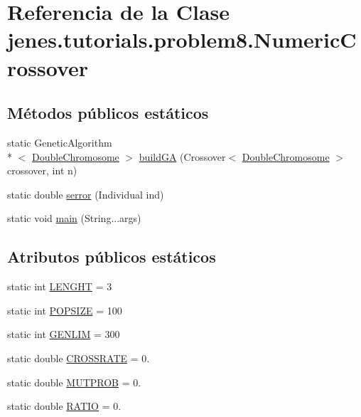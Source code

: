 \hypertarget{classjenes_1_1tutorials_1_1problem8_1_1_numeric_crossover}{\section{Referencia de la Clase jenes.\-tutorials.\-problem8.\-Numeric\-Crossover}
\label{classjenes_1_1tutorials_1_1problem8_1_1_numeric_crossover}
}
\subsection*{Métodos públicos estáticos}
\begin{DoxyCompactItemize}
\item 
static Genetic\-Algorithm\\*
$<$ \hyperlink{classjenes_1_1chromosome_1_1_double_chromosome}{Double\-Chromosome} $>$ \hyperlink{classjenes_1_1tutorials_1_1problem8_1_1_numeric_crossover_a8af3f285354dc96e81647a03d76d93c5}{build\-G\-A} (Crossover$<$ \hyperlink{classjenes_1_1chromosome_1_1_double_chromosome}{Double\-Chromosome} $>$ crossover, int n)
\item 
static double \hyperlink{classjenes_1_1tutorials_1_1problem8_1_1_numeric_crossover_aef1de8d283010a790fb20661fae423f2}{serror} (Individual ind)
\item 
static void \hyperlink{classjenes_1_1tutorials_1_1problem8_1_1_numeric_crossover_a11da9d09414921591a53cddb601cc203}{main} (String...\-args)
\end{DoxyCompactItemize}
\subsection*{Atributos públicos estáticos}
\begin{DoxyCompactItemize}
\item 
static int \hyperlink{classjenes_1_1tutorials_1_1problem8_1_1_numeric_crossover_af73d636c488b92bf3ae33d19d1f5f5e7}{L\-E\-N\-G\-H\-T} = 3
\item 
static int \hyperlink{classjenes_1_1tutorials_1_1problem8_1_1_numeric_crossover_a0a9b3b839ab6677dcbae723434df6551}{P\-O\-P\-S\-I\-Z\-E} = 100
\item 
static int \hyperlink{classjenes_1_1tutorials_1_1problem8_1_1_numeric_crossover_a5e45487dcf5730d7c628ca85b21160dc}{G\-E\-N\-L\-I\-M} = 300
\item 
static double \hyperlink{classjenes_1_1tutorials_1_1problem8_1_1_numeric_crossover_ae4fcf3a595e386c6aeec443dedaba83f}{C\-R\-O\-S\-S\-R\-A\-T\-E} = 0.
\item 
static double \hyperlink{classjenes_1_1tutorials_1_1problem8_1_1_numeric_crossover_a4d0587e4b39b1f74efd20a0c921c38f7}{M\-U\-T\-P\-R\-O\-B} = 0.
\item 
static double \hyperlink{classjenes_1_1tutorials_1_1problem8_1_1_numeric_crossover_ae3c1d4871321a6323d09add505679fe0}{R\-A\-T\-I\-O} = 0.
\end{DoxyCompactItemize}


